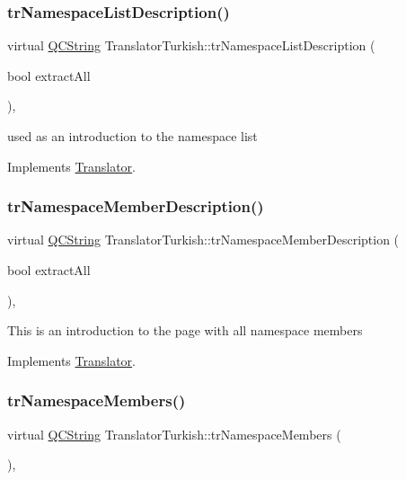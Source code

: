 \subsubsection{\texorpdfstring{trNamespaceListDescription()}{trNamespaceListDescription()}}
{\footnotesize\ttfamily virtual \mbox{\hyperlink{class_q_c_string}{Q\+C\+String}} Translator\+Turkish\+::tr\+Namespace\+List\+Description (\begin{DoxyParamCaption}\item[{bool}]{extract\+All }\end{DoxyParamCaption})\hspace{0.3cm}{\ttfamily [inline]}, {\ttfamily [virtual]}}

used as an introduction to the namespace list 

Implements \mbox{\hyperlink{class_translator}{Translator}}.

\mbox{\label{class_translator_turkish_a842205d78df9a1412d66d695c61fc49a}} 
\subsubsection{\texorpdfstring{trNamespaceMemberDescription()}{trNamespaceMemberDescription()}}
{\footnotesize\ttfamily virtual \mbox{\hyperlink{class_q_c_string}{Q\+C\+String}} Translator\+Turkish\+::tr\+Namespace\+Member\+Description (\begin{DoxyParamCaption}\item[{bool}]{extract\+All }\end{DoxyParamCaption})\hspace{0.3cm}{\ttfamily [inline]}, {\ttfamily [virtual]}}

This is an introduction to the page with all namespace members 

Implements \mbox{\hyperlink{class_translator}{Translator}}.

\mbox{\label{class_translator_turkish_abf98a31693d6c1cee6cee3543372162a}} 
\subsubsection{\texorpdfstring{trNamespaceMembers()}{trNamespaceMembers()}}
{\footnotesize\ttfamily virtual \mbox{\hyperlink{class_q_c_string}{Q\+C\+String}} Translator\+Turkish\+::tr\+Namespace\+Members (\begin{DoxyParamCaption}{ }\end{DoxyParamCaption})\hspace{0.3cm}{\ttfamily [inline]}, {\ttfamily [virtual]}}

